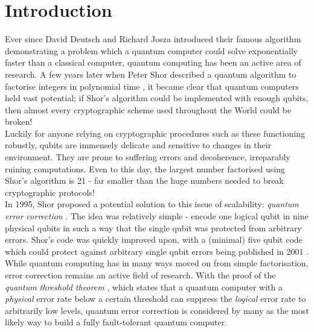 \documentclass[12pt,a4paper]{report}
\numberwithin{equation}{section}
\theoremstyle{definition}
\theoremstyle{theorem}
\theoremstyle{theorem}
\theoremstyle{example}
\theoremstyle{definition}
\begin{document}
\chapter{Introduction}
Ever since David Deutsch and Richard Josza introduced their famous algorithm \cite{DJ} demonstrating a problem which a quantum computer could solve exponentially faster than a classical computer, quantum computing has been an active area of research. A few years later when Peter Shor described a quantum algorithm to factorise integers in polynomial time \cite{Shor}, it became clear that quantum computers held vast potential; if Shor's algorithm could be implemented with enough qubits, then almost every cryptographic scheme used throughout the World could be broken!\\
Luckily for anyone relying on cryptographic procedures such as these functioning robustly, qubits are immensely delicate and sensitive to changes in their environment. They are prone to suffering errors and decoherence, irreparably ruining computations. Even to this day, the largest number factorised using Shor's algorithm is 21 \cite{FactorRecord} - far smaller than the huge numbers needed to break cryptographic protocols!\\
In 1995, Shor proposed a potential solution to this issue of scalability: \textit{quantum error correction} \cite{PhysRevA.52.R2493}. The idea was relatively simple - encode one logical qubit in nine physical qubits in such a way that the single qubit was protected from arbitrary errors. Shor's code was quickly improved upon, with a (minimal) five qubit code which could protect against arbitrary single qubit errors being published in 2001 \cite{PhysRevLett.86.5811}.\\
While quantum computing has in many ways moved on from simple factorisation, error correction remains an active field of research. With the proof of the \textit{quantum threshold theorem} \cite{doi:10.1137/S0097539799359385}\cite{doi:10.1126/science.279.5349.342}\cite{KITAEV20032}, which states that a quantum computer with a \textit{physical} error rate below a certain threshold can suppress the \textit{logical} error rate to arbitrarily low levels, quantum error correction is considered by many as the most likely way to build a fully fault-tolerant quantum computer.\\
\end{document}

